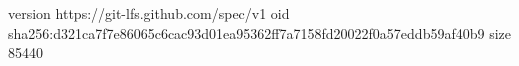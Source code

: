 version https://git-lfs.github.com/spec/v1
oid sha256:d321ca7f7e86065c6cac93d01ea95362ff7a7158fd20022f0a57eddb59af40b9
size 85440
